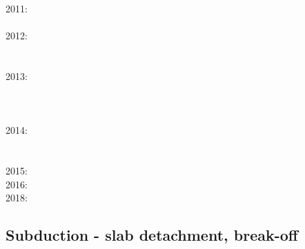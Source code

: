 2011: \cite{lixg11}\cite{list11}\cite{bubj11}\cite{bagw11b}\cite{cafz11}\cite{geme11}\cite{qube11}\\
      \cite{blgg11}\\
2012: \cite{anwb12}\cite{jahu12}\cite{jabi12}\cite{jabk12}\cite{lixg12}\cite{grpy12}\cite{grpy12b}\\
      \cite{ronb12}\cite{tebu12}\cite{thka12}\cite{bova12}\cite{civs12}\cite{camo12}\cite{cafa12} \\
      \cite{gebk12}\cite{liri12}\cite{beva12}\cite{uegb12}\\
2013: \cite{nabg13}\cite{hage13}\cite{ancv13}\cite{namu13}\cite{yosh13}\cite{zhgt13}\cite{lixg13} \\
      \cite{jabr13}\cite{izht13}\cite{luws13}\cite{dusc13}\cite{tibb13}\cite{bubj13}\cite{scmo13} \\
      \cite{fuob13}\cite{magc13}\cite{musi13}\cite{mibg13}\cite{grpy13}\cite{vagd13a}\cite{vagd13b}\\
      \cite{cavg13}\cite{vocg13}\\
2014: \cite{robn14}\cite{hond14}\cite{ronc14}\cite{mobm14}\cite{famc14}\cite{fogm14}\cite{frba14} \\
      \cite{gagd14}\cite{voge14}\cite{voge14b}\cite{lidr14}\cite{bocj04}\cite{bagb14}\cite{stjm14}\\
      \cite{basc14}\cite{vamd14}\\
2015: \cite{bemm15}\cite{bomv15}\cite{bogf15}\cite{ceag15}\cite{kifr15}\cite{vami15}\\
2016: \cite{tomy16}\cite{gukt16}\cite{robn16}\\
2018: \cite{yamz18}

\subsection*{Subduction - slab detachment, break-off}

